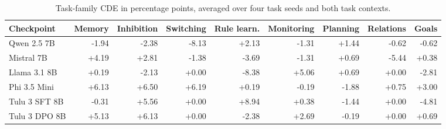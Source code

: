 \begin{table}[t]
\centering\scriptsize
\caption{Task-family CDE in percentage points, averaged over four task seeds and both task contexts.}
\label{tab:family-cde}
\setlength{\tabcolsep}{3.4pt}
\begin{tabular}{@{}lrrrrrrrr@{}}
\toprule
Checkpoint & Memory & Inhibition & Switching & Rule learn. & Monitoring & Planning & Relations & Goals \\
\midrule
Qwen 2.5 7B & -1.94 & -2.38 & -8.13 & +2.13 & -1.31 & +1.44 & -0.62 & -0.62 \\
Mistral 7B & +4.19 & +2.81 & -1.38 & -3.69 & -1.31 & +0.69 & -5.44 & +0.38 \\
Llama 3.1 8B & +0.19 & -2.13 & +0.00 & -8.38 & +5.06 & +0.69 & +0.00 & -2.81 \\
Phi 3.5 Mini & +6.13 & +6.50 & +6.19 & +0.19 & -0.19 & -1.88 & +0.75 & +3.00 \\
Tulu 3 SFT 8B & -0.31 & +5.56 & +0.00 & +8.94 & +0.38 & -1.44 & +0.00 & -4.81 \\
Tulu 3 DPO 8B & +5.13 & +6.13 & +0.00 & -2.38 & +2.69 & -0.19 & +0.00 & +0.69 \\
\bottomrule
\end{tabular}
\end{table}
